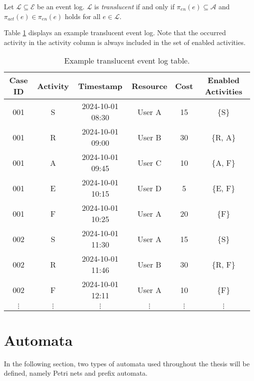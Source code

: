 \begin{definition}
    Let $\mathcal{L} \subseteq \mathcal{E}$ be an event log. $\mathcal{L}$ is \emph{translucent} if and only if $\pi_{en}(e) \subseteq \mathcal{A}$ and $\pi_{act}(e) \in \pi_{en}(e)$ holds for all $e \in \mathcal{L}$.
\end{definition}

Table \ref{tab:translucent_event_log} displays an example translucent event log. Note that the occurred activity in the activity column is always included in the set of enabled activities.

\renewcommand{\arraystretch}{1.25}
\begin{table}[h!]
    \centering
    \caption{Example translucent event log table.}
    \begin{tabular}{|c|c|c|c|c|c|}
        \hline
        \textbf{Case ID} & \textbf{Activity} & \textbf{Timestamp} & \textbf{Resource} & \textbf{Cost} & \textbf{Enabled Activities} \\ 
        \hline
        001 & S  & 2024-10-01 08:30 & User A & 15 & \{S\}\\ 
        001 & R    & 2024-10-01 09:00 & User B & 30 & \{R, A\}\\ 
        001 & A & 2024-10-01 09:45 & User C & 10 & \{A, F\}\\ 
        001 & E     & 2024-10-01 10:15 & User D & 5  & \{E, F\}\\ 
        001 & F & 2024-10-01 10:25 & User A & 20 & \{F\}\\
        002 & S  & 2024-10-01 11:30 & User A & 15 & \{S\}\\ 
        002 & R    & 2024-10-01 11:46 & User B & 30 & \{R, F\}\\ 
        002 & F & 2024-10-01 12:11 & User A & 10 & \{F\}\\ 
        $\vdots$ & $\vdots$ & $\vdots$ & $\vdots$ & $\vdots$ & $\vdots$ \\
        \hline
    \end{tabular}
    \label{tab:translucent_event_log}
\end{table}


\section{Automata}

In the following section, two types of automata used throughout the thesis will be defined, namely Petri nets and prefix automata.


